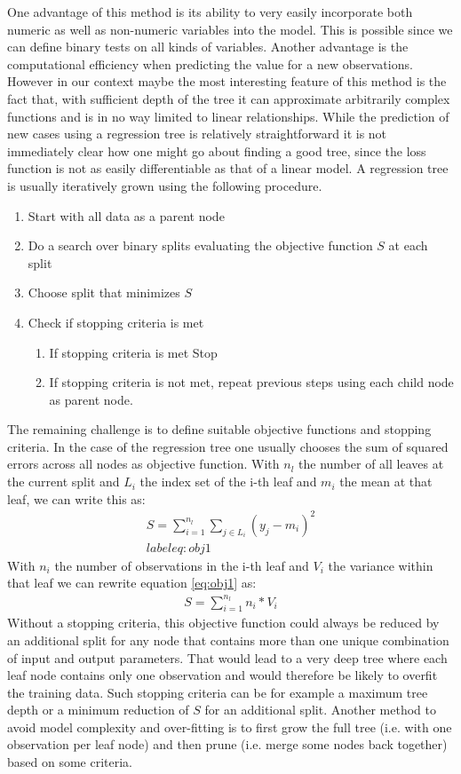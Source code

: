 One advantage of this method is its ability to very easily incorporate both numeric as well as non-numeric variables into the model. This is possible since we can define binary tests on all kinds of variables. Another advantage is the computational efficiency when predicting the value for a new observations. However in our context maybe the most interesting feature of this method is the fact that, with sufficient depth of the tree it can approximate arbitrarily complex functions and is in no way limited to linear relationships. While the prediction of new cases using a regression tree is relatively straightforward it is not immediately clear how one might go about finding a good tree, since the loss function is not as easily differentiable as that of a linear model. A regression tree is usually iteratively grown using the following procedure.
\begin{enumerate}
\item Start with all data as a parent node
\item Do a search over binary splits evaluating the objective function $S$ at each split
\item Choose split that minimizes $S$
\item Check if stopping criteria is met
\begin{enumerate}
	\item If stopping criteria is met Stop
	\item If stopping criteria is not met, repeat previous steps using each child node as parent node.
\end{enumerate}
\end{enumerate}
The remaining challenge is to define suitable objective functions and stopping criteria. In the case of the regression tree one usually chooses the sum of squared errors across all nodes as objective function. With $n_l$ the number of all leaves at the current split and $L_i$ the index set of the i-th leaf and $m_i$ the mean at that leaf, we can write this as:
\begin{align}
S = \sum_{i = 1}^{n_l} \sum_{j \in L_i} (y_j - m_i)^2 \\label{eq:obj1}
\end{align}
With $n_i$ the number of observations in the i-th leaf and $V_i$ the variance within that leaf we can rewrite equation \ref{eq:obj1} as:
\begin{align}
S = \sum_{i = 1}^{n_l}n_i * V_i
\end{align}
Without a stopping criteria, this objective function could always be reduced by an additional split for any node that contains more than one unique combination of input and output parameters. That would lead to a very deep tree where each leaf node contains only one observation and would therefore be likely to overfit the training data. Such stopping criteria can be for example a maximum tree depth or a minimum reduction of $S$ for an additional split. Another method to avoid model complexity and over-fitting is to first grow the full tree (i.e. with one observation per leaf node) and then prune (i.e. merge some nodes back together) based on some criteria.
